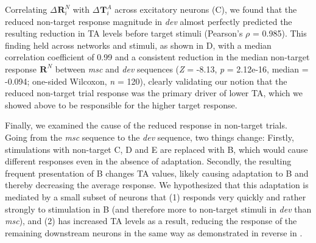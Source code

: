 \documentclass[9pt,lineno,onehalfspacing]{elife}
\newcommand{\dev}{\textit{dev}}
\newcommand{\msc}{\textit{msc}}
\newcommand{\R}[3][]{{}^{#1}_{}\boldsymbol R^{#2}_{#3}}
\newcommand{\T}[3][]{{}^{#1}_{}\boldsymbol T^{#2}_{#3}}
\begin{document}
Correlating $\Delta \R{N}{i}$ with $\Delta \T{A}{i}$ across excitatory neurons (C), we found that the reduced non-target response magnitude in \dev{} almost perfectly predicted the resulting reduction in TA levels before target stimuli (Pearson's $\rho$ = 0.985).
This finding held across networks and stimuli, as shown in D, with a median correlation coefficient of 0.99 and a consistent reduction in the median non-target response $\R{N}{}$ between \msc{} and \dev{} sequences (\textit{Z} = -8.13, \textit{p} = 2.12e-16, median = -0.094; one-sided Wilcoxon, \textit{n} = 120), clearly validating our notion that the reduced non-target trial response was the primary driver of lower TA, which we showed above to be responsible for the higher target response.

Finally, we examined the cause of the reduced response in non-target trials. Going from the \msc{} sequence to the \dev{} sequence, two things change: Firstly, stimulations with non-target C, D and E are replaced with B, which would cause different responses even in the absence of adaptation. Secondly, the resulting  frequent presentation of B changes TA values, likely causing adaptation to B and thereby decreasing the average response. We hypothesized that this adaptation is mediated by a small subset of neurons that (1) responds very quickly and rather strongly to stimulation in B (and therefore more to non-target stimuli in \dev{} than \msc{}), and (2) has increased TA levels as a result, reducing the response of the remaining downstream neurons in the same way as demonstrated in reverse in .
\end{document}
